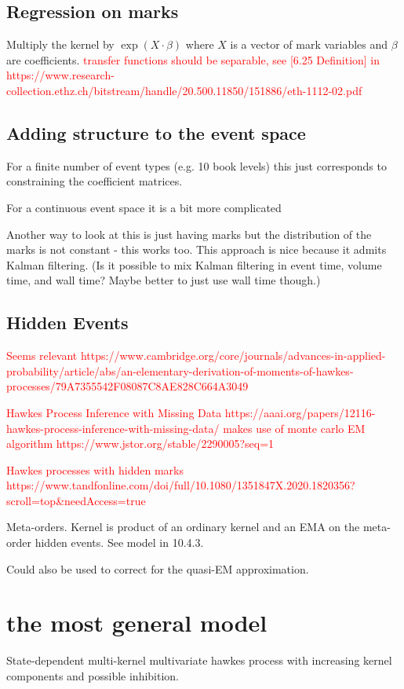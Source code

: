 \documentclass[honours,12pt]{unswthesis}
\numberwithin{equation}{section}
\begin{document}
\subsection{Regression on marks}

Multiply the kernel by $\exp\left(X\cdot\beta\right)$ where $X$ is a vector of mark variables and $\beta$ are coefficients.
\textcolor{red}{transfer functions should be separable, see [6.25 Definition] in https://www.research-collection.ethz.ch/bitstream/handle/20.500.11850/151886/eth-1112-02.pdf}

\subsection{Adding structure to the event space}
For a finite number of event types (e.g. 10 book levels) this just corresponds to constraining the coefficient matrices.

For a continuous event space it is a bit more complicated


Another way to look at this is just having marks but the distribution of the marks is not constant - this works too. This approach is nice because it admits Kalman filtering. (Is it possible to mix Kalman filtering in event time, volume time, and wall time? Maybe better to just use wall time though.)

\subsection{Hidden Events}
\textcolor{red}{Seems relevant https://www.cambridge.org/core/journals/advances-in-applied-probability/article/abs/an-elementary-derivation-of-moments-of-hawkes-processes/79A7355542F08087C8AE828C664A3049}

\textcolor{red}{Hawkes Process Inference with Missing Data https://aaai.org/papers/12116-hawkes-process-inference-with-missing-data/ makes use of monte carlo EM algorithm https://www.jstor.org/stable/2290005?seq=1}

\textcolor{red}{Hawkes processes with hidden marks https://www.tandfonline.com/doi/full/10.1080/1351847X.2020.1820356?scroll=top&needAccess=true}

Meta-orders. Kernel is product of an ordinary kernel and an EMA on the meta-order hidden events. See model in \cite{BouchaudEtAl} 10.4.3.

Could also be used to correct for the quasi-EM approximation.

\section{the most general model}
State-dependent multi-kernel multivariate hawkes process with increasing kernel components and possible inhibition.
\end{document}
